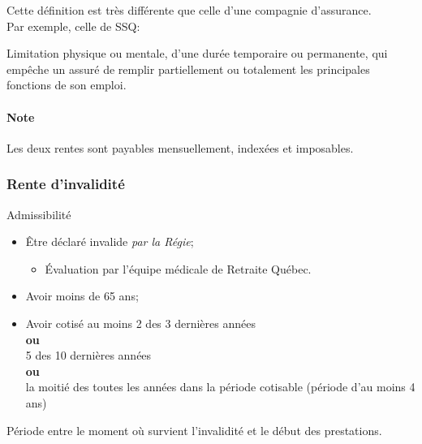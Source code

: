 \documentclass[10pt, french]{article}
\begin{document}
\begin{multicols*}{3}
\begin{definitionNOHFILL}[Invalide]
Cette définition est très différente que celle d'une compagnie d'assurance. \\
Par exemple, celle de SSQ:
\begin{center}
	\colorbox{asparagus}{\parbox{0.9\textwidth}{Limitation physique ou mentale, d’une durée temporaire ou permanente, qui empêche un assuré de remplir partiellement ou totalement les principales fonctions de son emploi.}}
\end{center}
\end{definitionNOHFILL}
		
\paragraph*{Note}	Les deux rentes sont payables mensuellement, indexées et imposables.
	
\subsubsection*{Rente d'invalidité}

\begin{conceptgen}{Admissibilité}
\begin{itemize}[leftmargin = *]
	\item	Être déclaré invalide \textit{par la Régie};
		\begin{itemize}[leftmargin = *]
		\item	Évaluation par l'équipe médicale de Retraite Québec.
		\end{itemize}
	\item	Avoir moins de 65 ans;
	\item	Avoir cotisé au moins 2 des 3 dernières années\\
			\textbf{ou}	\\
			5 des 10 dernières années	\\
			\textbf{ou}	\\
			la moitié des toutes les années dans la période cotisable (période d'au moins 4 ans)
\end{itemize}
\end{conceptgen}

\begin{definitionNOHFILL}
Période entre le moment où survient l'invalidité et le début des prestations.
\end{definitionNOHFILL}



\end{multicols*}
\end{document}
